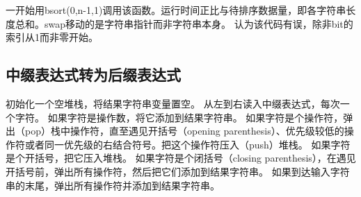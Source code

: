 一开始用bsort(0,n-1,1)调用该函数。运行时间正比与待排序数据量，即各字符串长度总和。swap移动的是字符串指针而非字符串本身。 \cite{self}认为该代码有误，除非bit的索引从1而非零开始。

\subsection{中缀表达式转为后缀表达式}
初始化一个空堆栈，将结果字符串变量置空。
从左到右读入中缀表达式，每次一个字符。
如果字符是操作数，将它添加到结果字符串。
如果字符是个操作符，弹出（pop）栈中操作符，直至遇见开括号（opening parenthesis）、优先级较低的操作符或者同一优先级的右结合符号。把这个操作符压入（push）堆栈。
如果字符是个开括号，把它压入堆栈。
如果字符是个闭括号（closing parenthesis），在遇见开括号前，弹出所有操作符，然后把它们添加到结果字符串。
如果到达输入字符串的末尾，弹出所有操作符并添加到结果字符串。




















